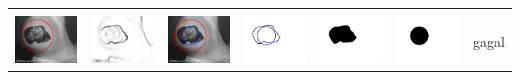 \begin{table}[H]
\begin{tabular}{|m{0.7in}|m{0.7in}|m{0.7in}|m{0.7in}|m{0.7in}|m{0.7in}|m{0.7in}|}
		&  &  & & & &  \\
		\includegraphics[width=0.7in]{dataset/dataset_3/luka_hitam/ready/37_integer_init.jpg}&
		\includegraphics[width=0.7in]{dataset/dataset_3/luka_hitam/ready/37_integer_ext.jpg}&
		\includegraphics[width=0.7in]{dataset/dataset_3/luka_hitam/ready/37_integer_result.jpg}&
		\includegraphics[width=0.7in]{dataset/dataset_3/luka_hitam/ready/37_gt_r_integer.jpg}&
		\includegraphics[width=0.7in]{dataset/dataset_3/luka_hitam/ready/37_r.jpg}&
		\includegraphics[width=0.7in]{dataset/dataset_3/luka_hitam/ready/37_integer_r.jpg}&
		gagal\\
		\hline
		
	\end{tabular}
\end{table}

